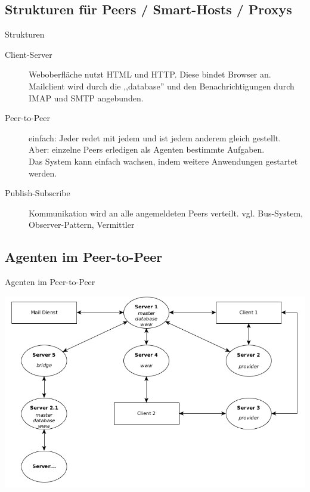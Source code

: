 \documentclass{beamer}
\begin{document}
\subsection{Strukturen für Peers / Smart-Hosts / Proxys }


\begin{frame}{Strukturen}
	
	
	\begin{description}
		\item[Client-Server] Weboberfläche nutzt HTML und HTTP. Diese bindet Browser an.\\
		Mailclient wird durch die ,,database'' und den Benachrichtigungen durch IMAP und SMTP angebunden.\\
				
		\item[Peer-to-Peer]  einfach: Jeder redet mit jedem und ist jedem anderem gleich gestellt.\\
		 Aber: einzelne Peers erledigen als Agenten bestimmte Aufgaben.\\
		 Das System kann einfach wachsen, indem weitere Anwendungen gestartet werden.
		 \item[Publish-Subscribe] Kommunikation wird an alle angemeldeten Peers verteilt. 
		 vgl. Bus-System, Observer-Pattern, Vermittler
	\end{description}
	 
\end{frame}


\subsection{Agenten im Peer-to-Peer}


\begin{frame}{Agenten im Peer-to-Peer}
 
	 \includegraphics[width=\textwidth]{clients_uebersicht.png}
	 
	
\end{frame}
\end{document}
